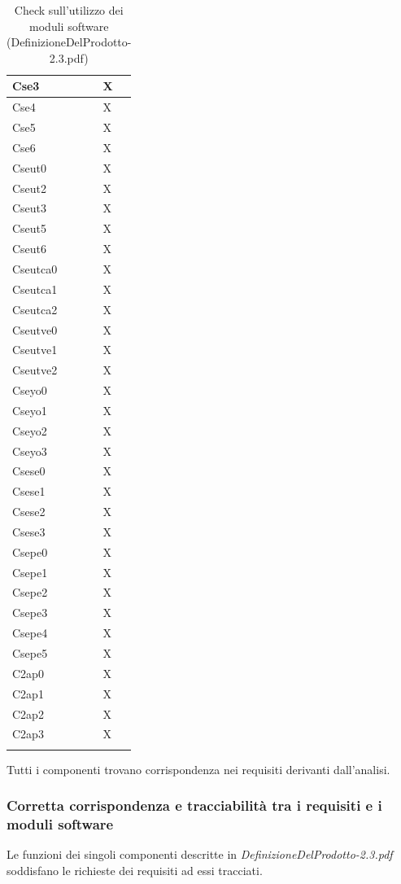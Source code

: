 \begin{footnotesize}
\begin{longtable}{|p{}|p{}|}
Cse3 &X\\\hline 
Cse4 &X\\\hline 
Cse5 &X\\\hline 
Cse6 &X\\\hline 
Cseut0 &X\\\hline 
Cseut2 &X\\\hline 
Cseut3 &X\\\hline  
Cseut5 &X\\\hline
Cseut6 &X\\\hline
Cseutca0 &X\\\hline
Cseutca1 &X\\\hline
Cseutca2 &X\\\hline
Cseutve0 &X\\\hline
Cseutve1 &X\\\hline
Cseutve2 &X\\\hline
Cseyo0 &X\\\hline
Cseyo1 &X\\\hline
Cseyo2 &X\\\hline
Cseyo3 &X\\\hline
Csese0 &X\\\hline 
Csese1 &X\\\hline 
Csese2 &X\\\hline 
Csese3 &X\\\hline 
Csepe0 &X\\\hline 
Csepe1 &X\\\hline 
Csepe2 &X\\\hline 
Csepe3 &X\\\hline 
Csepe4 &X\\\hline 
Csepe5 &X\\\hline
C2ap0 &X\\\hline
C2ap1 &X\\\hline
C2ap2 &X\\\hline
C2ap3 &X\\\hline

\caption{Check sull'utilizzo dei moduli software
(DefinizioneDelProdotto-2.3.pdf)}
\end{longtable}
\end{footnotesize}

Tutti i componenti trovano corrispondenza nei requisiti derivanti dall'analisi.

\subsubsection*{Corretta corrispondenza e tracciabilit\`a tra i requisiti e i
moduli software} 
Le funzioni dei singoli componenti descritte in
\emph{DefinizioneDelProdotto-2.3.pdf} soddisfano le richieste dei requisiti ad
essi tracciati.

